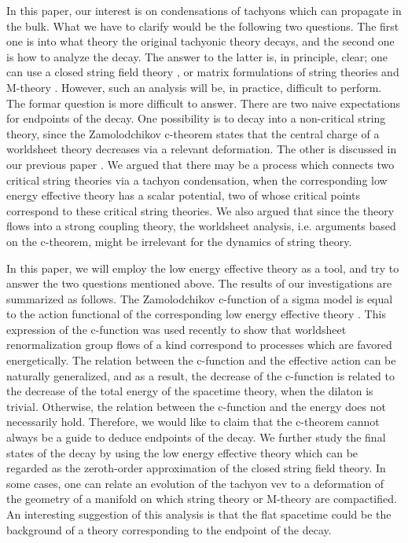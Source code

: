 \documentclass[a4paper,a4paper]{article}
\begin{document}
In this paper, our interest is on condensations of tachyons which can propagate in the bulk. 
What we have to clarify would be the following two questions. 
The first one is into what theory the original tachyonic theory decays, and the second one is how to analyze the 
decay. 
The answer to the latter is, in principle, clear; one can use a closed string field theory \cite{closedSFT}, or 
matrix 
formulations of string theories and M-theory \cite{BFSS}\cite{IKKT}\cite{DVV}. 
However, such an analysis will be, in practice, difficult to perform. 
The formar question is more difficult to answer. 
There are two naive expectations for endpoints of the decay. 
One possibility is to decay into a non-critical string theory, since the Zamolodchikov c-theorem 
\cite{Zamolodchikov}  states that 
the central charge of a worldsheet theory decreases via a relevant deformation. 
The other is discussed in our previous paper \cite{suyama}. 
We argued that there may be a process which connects two critical string theories via a tachyon condensation, 
when the 
corresponding low energy effective theory has a scalar potential, two of whose critical points correspond to these 
critical string theories. 
We also argued that since the theory flows into a strong coupling theory, the worldsheet analysis, i.e. arguments 
based on the c-theorem, might be irrelevant for the dynamics of string theory. 

In this paper, we will employ the low energy effective theory as a tool, and try to answer the two questions 
mentioned above. 
The results of our investigations are summarized as follows. 
The Zamolodchikov c-function of a sigma model is equal to the action functional of the corresponding low energy 
effective theory \cite{Tseytlin}. 
This expression of the c-function was used recently \cite{GHMS} to show that worldsheet renormalization group 
flows of a kind correspond to processes which are favored energetically. 
The relation between the c-function and the effective action can be naturally generalized, and as a result, 
the decrease of the c-function is related to the decrease of the total energy of the spacetime theory, when the 
dilaton is trivial. 
Otherwise, the relation between the c-function and the energy does not necessarily hold. 
Therefore, we would like to claim that the c-theorem cannot always be a guide to deduce endpoints of the 
decay. 
We further study the final states of the decay by using the low energy effective theory which can be regarded as 
the zeroth-order approximation of the closed string field theory. 
In some cases, one can relate an evolution of the tachyon vev to a deformation of the geometry of a manifold on 
which string theory or M-theory are compactified. 
An interesting suggestion of this analysis is that the flat spacetime could be the background of a theory 
corresponding to the endpoint of the decay. 
\end{document}
